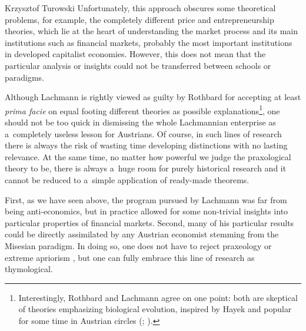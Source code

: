 \begin{artengenv}{Krzysztof Turowski}
Unfortunately, this approach obscures some theoretical problems, for example, the completely different price and entrepreneurship theories, which lie at the heart of understanding the market process and its main institutions such as financial markets, probably the most important institutions in developed capitalist economies.
However, this does not mean that the particular analysis or insights could not be transferred between schools or paradigms.

Although Lachmann is rightly viewed as guilty by Rothbard for accepting at least \emph{prima facie} on equal footing different theories as possible explanations\footnote{Interestingly, Rothbard and Lachmann agree on one point: both are skeptical of theories emphasizing biological evolution, inspired by Hayek and popular for some time in Austrian circles (\cite[81]{rothbard-present}; \cite[Lachmann quoted in][26]{dekker-lachmann}).}, one should not be too quick in dismissing the whole Lachmannian enterprise as a~completely useless lesson for Austrians.
Of course, in such lines of research there is always the risk of wasting time developing distinctions with no lasting relevance. At the same time, no matter how powerful we judge the praxological theory to be, there is always a~huge room for purely historical research and it cannot be reduced to a~simple application of ready-made theorems.

First, as we have seen above, the program pursued by Lachmann was far from being anti-economics, but in practice allowed for some non-trivial insights into particular properties of financial markets. Second, many of his particular results could be directly assimilated by any Austrian economist stemming from the Misesian paradigm.
In doing so, one does not have to reject praxeology or extreme apriorism \parencite{rothbard-defense}, but one can fully embrace this line of research as thymological.


\end{artengenv}
